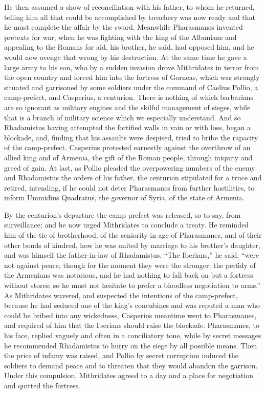
He then assumed a show of reconciliation with his father, to whom he returned, telling him all that could be accomplished by treachery was now ready and that he must complete the affair by the sword. Meanwhile Pharasmanes invented pretexts for war; when he was fighting with the king of the Albanians and appealing to the Romans for aid, his brother, he said, had opposed him, and he would now avenge that wrong by his destruction. At the same time he gave a large army to his son, who by a sudden invasion drove Mithridates in terror from the open country and forced him into the fortress of Gorneas, which was strongly situated and garrisoned by some soldiers under the command of Caelius Pollio, a camp-prefect, and Casperius, a centurion. There is nothing of which barbarians are so ignorant as military engines and the skilful management of sieges, while that is a branch of military science which we especially understand. And so Rhadamistus having attempted the fortified walls in vain or with loss, began a blockade, and, finding that his assaults were despised, tried to bribe the rapacity of the camp-prefect. Casperius protested earnestly against the overthrow of an allied king and of Armenia, the gift of the Roman people, through iniquity and greed of gain. At last, as Pollio pleaded the overpowering numbers of the enemy and Rhadamistus the orders of his father, the centurion stipulated for a truce and retired, intending, if he could not deter Pharasmanes from further hostilities, to inform Ummidius Quadratus, the governor of Syria, of the state of Armenia.


By the centurion's departure the camp prefect was released, so to say, from surveillance; and he now urged Mithridates to conclude a treaty. He reminded him of the tie of brotherhood, of the seniority in age of Pharasmanes, and of their other bonds of kindred, how he was united by marriage to his brother's daughter, and was himself the father-in-law of Rhadamistus. ``The Iberians,'' he said, ``were not against peace, though for the moment they were the stronger; the perfidy of the Armenians was notorious, and he had nothing to fall back on but a fortress without stores; so he must not hesitate to prefer a bloodless negotiation to arms.'' As Mithridates wavered, and suspected the intentions of the camp-prefect, because he had seduced one of the king's concubines and was reputed a man who could be bribed into any wickedness, Casperius meantime went to Pharasmanes, and required of him that the Iberians should raise the blockade. Pharasmanes, to his face, replied vaguely and often in a conciliatory tone, while by secret messages he recommended Rhadamistus to hurry on the siege by all possible means. Then the price of infamy was raised, and Pollio by secret corruption induced the soldiers to demand peace and to threaten that they would abandon the garrison. Under this compulsion, Mithridates agreed to a day and a place for negotiation and quitted the fortress.

